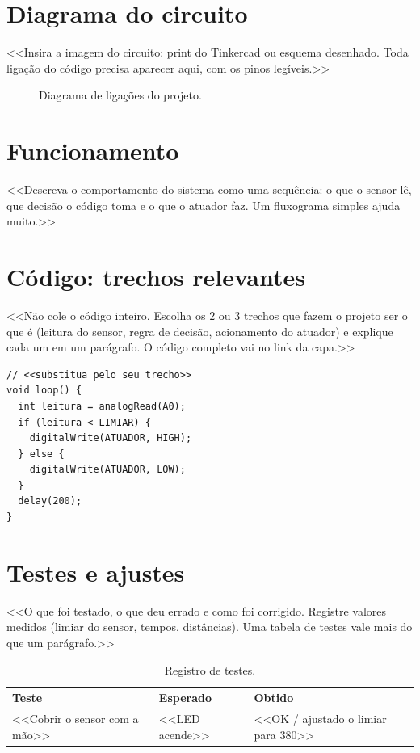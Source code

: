 \documentclass[12pt,a4paper]{article}
\begin{document}
\section{Diagrama do circuito}
<<Insira a imagem do circuito: print do Tinkercad ou esquema desenhado. Toda ligação do
código precisa aparecer aqui, com os pinos legíveis.>>

\begin{figure}[H]
  \centering
  \caption{Diagrama de ligações do projeto.}
\end{figure}

\section{Funcionamento}
<<Descreva o comportamento do sistema como uma sequência: o que o sensor lê, que decisão
o código toma e o que o atuador faz. Um fluxograma simples ajuda muito.>>

\section{Código: trechos relevantes}
<<Não cole o código inteiro. Escolha os 2 ou 3 trechos que fazem o projeto ser o que é
(leitura do sensor, regra de decisão, acionamento do atuador) e explique cada um em
um parágrafo. O código completo vai no link da capa.>>

\begin{lstlisting}[caption={Leitura do sensor e decisão.}]
// <<substitua pelo seu trecho>>
void loop() {
  int leitura = analogRead(A0);
  if (leitura < LIMIAR) {
    digitalWrite(ATUADOR, HIGH);
  } else {
    digitalWrite(ATUADOR, LOW);
  }
  delay(200);
}
\end{lstlisting}

\section{Testes e ajustes}
<<O que foi testado, o que deu errado e como foi corrigido. Registre valores medidos
(limiar do sensor, tempos, distâncias). Uma tabela de testes vale mais do que um parágrafo.>>

\begin{table}[H]
  \centering
  \begin{tabular}{lll}
    \toprule
    \textbf{Teste} & \textbf{Esperado} & \textbf{Obtido} \\
    \midrule
    <<Cobrir o sensor com a mão>> & <<LED acende>> & <<OK / ajustado o limiar para 380>> \\
    \bottomrule
  \end{tabular}
  \caption{Registro de testes.}
\end{table}
\end{document}

